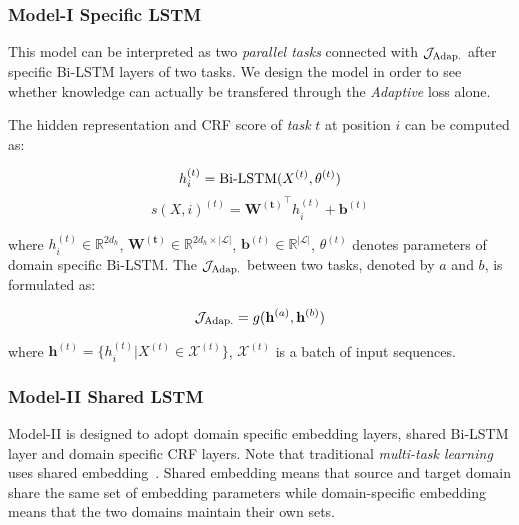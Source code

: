 \subsubsection{Model-\RN{1} Specific LSTM}

This model can be interpreted as two \textit{parallel tasks} connected with $\mathcal{J}_{\textnormal{Adap.}}$ after specific Bi-LSTM layers of two tasks. We design the model in order to see whether knowledge can actually be transfered through the \textit{Adaptive} loss alone.

The hidden representation and CRF score of \textit{task} $t$ at position $i$ can be computed as:

\small
\begin{equation}\label{eq:model_1_h}
h_i^{(t)} = \textnormal{Bi-LSTM}(X^{(t)}, \theta^{(t)})
\end{equation}
\begin{equation}\label{eq:model_1_s}
s(X, i)^{(t)} = \mathbf{W^{(t)}}^\top h_i^{(t)} + \mathbf{b}^{(t)}
\end{equation}
\normalsize

\noindent where $h_i^{(t)} \in \mathbb{R}^{2d_h}$, $\mathbf{W^{(t)}} \in \mathbb{R}^{2d_h \times |\mathcal{L}|}$, $\mathbf{b}^{(t)} \in \mathbb{R}^{|\mathcal{L}|}$, $\theta^{(t)}$ denotes parameters of domain specific Bi-LSTM. The $\mathcal{J}_{\textnormal{Adap.}}$ between two tasks, denoted by $a$ and $b$, is formulated as:

\small
\begin{equation}\label{eq:model_1_adap}
\mathcal{J}_{\textnormal{Adap.}} = g(\mathbf{h}^{(a)}, \mathbf{h}^{(b)})
\end{equation}
\normalsize

\noindent where $\mathbf{h}^{(t)} = \{h_i^{(t)} | X^{(t)} \in \mathcal{X}^{(t)}\}$, $\mathcal{X}^{(t)}$ is a batch of input sequences.

\subsubsection{Model-\RN{2} Shared LSTM}

Model-\RN{2} is designed to adopt domain specific embedding layers, shared 
Bi-LSTM layer and domain specific CRF layers. Note that traditional 
\textit{multi-task learning} uses shared embedding~\cite{DBLP:journals/corr/Ruder17a}. 
Shared embedding means that source and target domain share the same set of 
embedding parameters while domain-specific embedding means that the two 
domains maintain their own sets.

